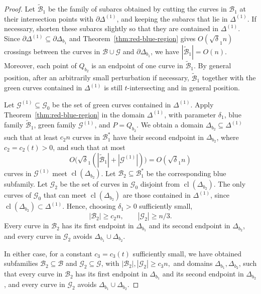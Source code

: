 \documentclass[11pt]{article}
\theoremstyle{plain}
\theoremstyle{definition}
\theoremstyle{remark}
\begin{document}
\begin{proof}
Let \(\widetilde{\mathcal B}_1\) be the family of subarcs obtained by cutting
the curves in \(\mathcal B_1\) at their intersection points with
\(\partial\Delta^{(1)}\), and keeping the subarcs that lie in
\(\Delta^{(1)}\). If necessary, shorten these subarcs slightly so that they
are contained in \(\Delta^{(1)}\). Since $\partial\Delta^{(1)}\subseteq\partial\Delta_{b_1}$ and Theorem~\ref{thm:red-blue-region} gives \(O(\sqrt\delta_1 n)\) crossings
between the curves in \(\mathcal B\cup\mathcal G\) and \(\partial\Delta_{b_1}\), we have $
|\widetilde{\mathcal B}_1|=O(n).$  Moreover, each point of \(Q_{b_2}\) is an endpoint of one curve in
\(\widetilde{\mathcal B}_1\). By general position, after an arbitrarily small
perturbation if necessary, \(\widetilde{\mathcal B}_1\) together with the
green curves contained in \(\Delta^{(1)}\) is still \(t\)-intersecting and in
general position.

Let \(\mathcal G^{(1)}\subseteq\mathcal G_0\) be the set of green curves
contained in \(\Delta^{(1)}\). Apply Theorem~\ref{thm:red-blue-region} in the domain
\(\Delta^{(1)}\), with parameter \(\delta_1\), blue family
\(\widetilde{\mathcal B}_1\), green family \(\mathcal G^{(1)}\), and
\(P=Q_{b_2}\). We obtain a domain \(\Delta_{b_2}\subseteq\Delta^{(1)}\) such
that at least \(c_2n\) curves in \(\mathcal B_1^*\) have their second
endpoint in \(\Delta_{b_2}\), where \(c_2=c_2(t)>0\), and such that at most
\[
O\bigl(\sqrt\delta_1(|\widetilde{\mathcal B}_1|+|\mathcal G^{(1)}|)\bigr)
=O(\sqrt\delta_1 n)
\]
curves in \(\mathcal G^{(1)}\) meet \(\operatorname{cl}(\Delta_{b_2})\).
Let \(\mathcal B_2\subseteq\mathcal B_1^*\) be the corresponding blue
subfamily. Let \(\mathcal G_2\) be the set of curves in \(\mathcal G_0\)
disjoint from \(\operatorname{cl}(\Delta_{b_2})\). The only curves of
\(\mathcal G_0\) that can meet \(\operatorname{cl}(\Delta_{b_2})\) are those
contained in \(\Delta^{(1)}\), since
\(\operatorname{cl}(\Delta_{b_2})\subset\Delta^{(1)}\). Hence, choosing
\(\delta_1>0\) sufficiently small,
\[
|\mathcal B_2|\ge c_2n,\qquad |\mathcal G_2|\ge n/3.
\]
Every curve in \(\mathcal B_2\) has its first endpoint in \(\Delta_{b_1}\)
and its second endpoint in \(\Delta_{b_2}\), and every curve in
\(\mathcal G_2\) avoids \(\Delta_{b_1}\cup\Delta_{b_2}\).

\medskip
In either case, for a constant $c_3  = c_3(t)$ sufficiently small, we have obtained
subfamilies \(\mathcal B_2\subseteq\mathcal B\) and
\(\mathcal G_2\subseteq\mathcal G\), with $|\mathcal B_2|,|\mathcal G_2|\ge c_3n,$ 
and domains \(\Delta_{b_1},\Delta_{b_2}\), such that every curve in
\(\mathcal B_2\) has its first endpoint in \(\Delta_{b_1}\) and its second
endpoint in \(\Delta_{b_2}\), and every curve in \(\mathcal G_2\) avoids
\(\Delta_{b_1}\cup\Delta_{b_2}\).


\end{proof}
\end{document}
